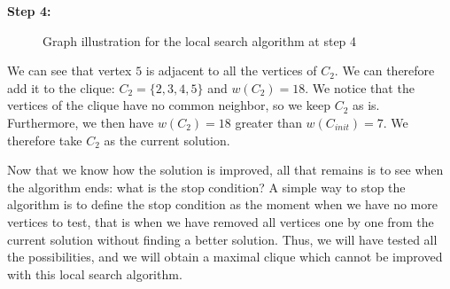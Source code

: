 \begin{minipage}{\linewidth}
    \textbf{Step 4:} \newline
    
    \begin{minipage}{0.4\textwidth}
        \begin{figure}[H]
            \centering
            \caption{Graph illustration for the local search algorithm at step 4}
            \label{fig:local-search-mewc-neighbour-4}
        \end{figure}
    \end{minipage}
    \begin{minipage}{0.6\textwidth}
        We can see that vertex $5$ is adjacent to all the vertices of $C_2$. We can 
        therefore add it to the clique: $C_2 = \{2, 3, 4, 5\}$ and $w(C_2) = 18$. We 
        notice that the vertices of the clique have no common neighbor, so we keep 
        $C_2$ as is. Furthermore, we then have $w(C_2) = 18$ greater than $w(C_{init}) = 7$. We 
        therefore take $C_2$ as the current solution.
    \end{minipage}
\end{minipage}

\bigskip

Now that we know how the solution is improved, all that remains is to see when the algorithm 
ends: what is the stop condition? A simple way to stop the algorithm is to define the stop 
condition as the moment when we have no more vertices to test, that is when we have removed 
all vertices one by one from the current solution without finding a better solution. Thus, 
we will have tested all the possibilities, and we will obtain a maximal clique which cannot 
be improved with this local search algorithm.